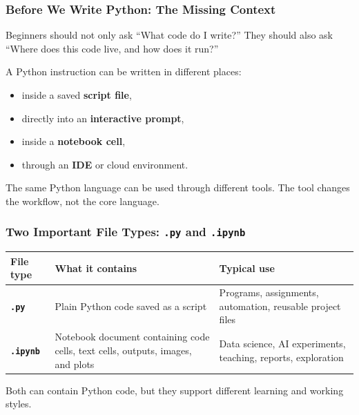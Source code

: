 \documentclass[aspectratio=169,10pt]{beamer}
\newcommand{\keyword}[1]{\textcolor{PrimaryBlue}{\textbf{#1}}}
\begin{document}
\begin{frame}
\frametitle{Before We Write Python: The Missing Context}
\vspace{-0.05cm}
\begin{tcolorbox}[lecturebox,title=Key idea]
Beginners should not only ask ``What code do I write?'' They should also ask ``Where does this code live, and how does it run?''
\end{tcolorbox}

A Python instruction can be written in different places:
\begin{itemize}\setlength\itemsep{0.13cm}
  \item inside a saved \keyword{script file},
  \item directly into an \keyword{interactive prompt},
  \item inside a \keyword{notebook cell},
  \item through an \keyword{IDE} or cloud environment.
\end{itemize}
\vspace{0.25cm}
\begin{tcolorbox}[lecturebox,title=Checkpoint]
The same Python language can be used through different tools. The tool changes the workflow, not the core language.
\end{tcolorbox}
\end{frame}


\begin{frame}
\frametitle{Two Important File Types: \texttt{.py} and \texttt{.ipynb}}
\vspace{0.45cm}
\renewcommand{\arraystretch}{1.35}
\begin{tabularx}{\textwidth}{>{\bfseries}p{2.25cm}X X}
\toprule
File type & What it contains & Typical use \\
\midrule
\texttt{.py} & Plain Python code saved as a script & Programs, assignments, automation, reusable project files \\
\texttt{.ipynb} & Notebook document containing code cells, text cells, outputs, images, and plots & Data science, AI experiments, teaching, reports, exploration \\
\bottomrule
\end{tabularx}
\vspace{0.55cm}
\begin{tcolorbox}[lecturebox,title=Checkpoint]
Both can contain Python code, but they support different learning and working styles.
\end{tcolorbox}
\end{frame}
\end{document}
